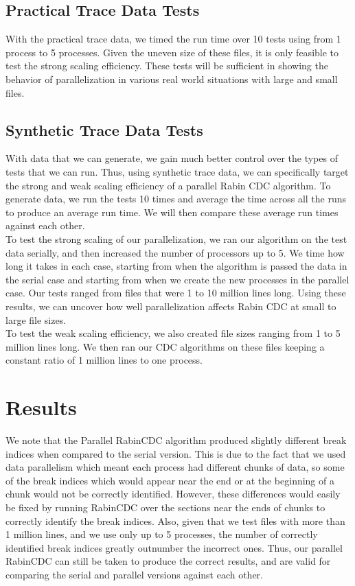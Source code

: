 \documentclass{acmtog} %
\begin{document}
	\subsection{Practical Trace Data Tests}


	With the practical trace data, we timed the run time over 10 tests using from 1 process to 5 processes. Given the uneven size of these files, it is only feasible to test the strong scaling efficiency. These tests will be sufficient in showing the behavior of parallelization in various real world situations with large and small files.
	
	
	\subsection{Synthetic Trace Data Tests}
	With data that we can generate, we gain much better control over the types of tests that we can run. Thus, using synthetic trace data, we can specifically target the strong and weak scaling efficiency of a parallel Rabin CDC algorithm. To generate data, we run the tests 10 times and average the time across all the runs to produce an average run time. We will then compare these average run times against each other. \\
	
	To test the strong scaling of our parallelization, we ran our algorithm on the test data serially, and then increased the number of processors up to 5. We time how long it takes in each case, starting from when the algorithm is passed the data in the serial case and starting from when we create the new processes in the parallel case. Our tests ranged from files that were 1 to 10 million lines long. Using these results, we can uncover how well parallelization affects Rabin CDC at small to large file sizes.\\
	
	To test the weak scaling efficiency, we also created file sizes ranging from 1 to 5 million lines long. We then ran our CDC algorithms on these files keeping a constant ratio of 1 million lines to one process. \\ 
	
	\section{Results}
	We note that the Parallel RabinCDC algorithm produced slightly different break indices when compared to the serial version. This is due to the fact that we used data parallelism which meant each process had different chunks of data, so some of the break indices which would appear near the end or at the beginning of a chunk would not be correctly identified. However, these differences would easily be fixed by running RabinCDC over the sections near the ends of chunks to correctly identify the break indices. Also, given that we test files with more than 1 million lines, and we use only up to 5 processes, the number of correctly identified break indices greatly outnumber the incorrect ones. Thus, our parallel RabinCDC can still be taken to produce the correct results, and are valid for comparing the serial and parallel versions against each other.
	
\end{document}
